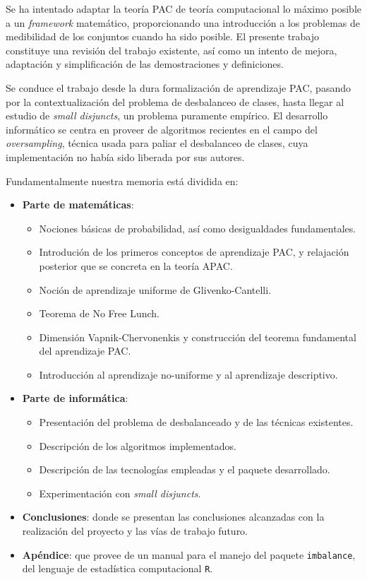 Se ha intentado adaptar la teoría PAC de teoría computacional lo máximo posible a un \textit{framework} matemático, proporcionando
una introducción a los problemas de medibilidad de los conjuntos cuando ha sido posible. El presente trabajo constituye una
revisión del trabajo existente, así como un intento de mejora, adaptación y simplificación de las demostraciones y definiciones.

Se conduce el trabajo desde la dura formalización de aprendizaje PAC, pasando por la contextualización del problema de 
desbalanceo de clases, hasta llegar al estudio de \textit{small disjuncts}, un problema puramente empírico. El desarrollo
informático se centra en proveer de algoritmos recientes en el campo del \textit{oversampling}, técnica usada para paliar
el desbalanceo de clases, cuya implementación no había sido liberada por sus autores.

Fundamentalmente nuestra memoria está dividida en:
\begin{itemize}
\item \textbf{Parte de matemáticas}:
 \begin{itemize}
  \item Nociones básicas de probabilidad, así como desigualdades fundamentales.
  \item Introdución de los primeros conceptos de aprendizaje PAC, y relajación posterior que se concreta en la teoría APAC.
  \item Noción de aprendizaje uniforme de Glivenko-Cantelli.
  \item Teorema de No Free Lunch.
  \item Dimensión Vapnik-Chervonenkis y construcción del teorema fundamental del aprendizaje PAC.
  \item Introducción al aprendizaje no-uniforme y al aprendizaje descriptivo.
 \end{itemize}
\item \textbf{Parte de informática}:
 \begin{itemize}
  \item Presentación del problema de desbalanceado y de las técnicas existentes.
  \item Descripción de los algoritmos implementados.
  \item Descripción de las tecnologías empleadas y el paquete desarrollado.
  \item Experimentación con \textit{small disjuncts}.
 \end{itemize}
\item \textbf{Conclusiones}: donde se presentan las conclusiones alcanzadas con la realización del proyecto y las vías de 
 trabajo futuro.
\item \textbf{Apéndice}: que provee de un manual para el manejo del paquete \texttt{imbalance}, del lenguaje de estadística
computacional \texttt{R}.
\end{itemize}


